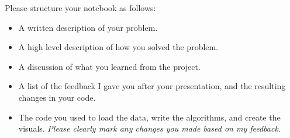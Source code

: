 \documentclass{article}
\begin{document}
Please structure your notebook as follows:
\begin{itemize}
    \item A written description of your problem.
    \item A high level description of how you solved the problem.
    \item A discussion of what you learned from the project.
    \item A list of the feedback I gave you after your presentation, and the resulting changes in your code.
    \item The code you used to load the data, write the algorithms, and create the visuals.
    \textit{Please clearly mark any changes you made based on my feedback.}
\end{itemize}
\end{document}
